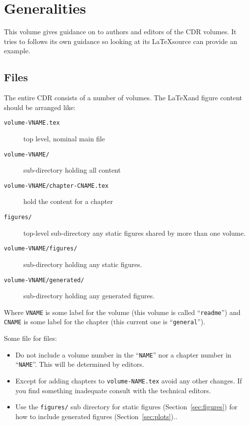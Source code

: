 \chapter{Generalities}

This volume gives guidance on to authors and editors of the CDR volumes.  It tries to follows its own guidance so looking at its \LaTeX source can provide an example.  

\section{Files}
\label{sec:files}

The entire CDR consists of a number of volumes.  The \LaTeX and figure content should be arranged like:

\begin{description}
\item[\texttt{volume-VNAME.tex}] top level, nominal main file
\item[\texttt{volume-VNAME/}] sub-directory holding all content
\item[\texttt{volume-VNAME/chapter-CNAME.tex}] hold the content for a chapter
\item[\texttt{figures/}] top-level sub-directory any static figures shared by more than one volume.
\item[\texttt{volume-VNAME/figures/}] sub-directory holding any static figures.
\item[\texttt{volume-VNAME/generated/}] sub-directory holding any generated figures.
\end{description}

Where \texttt{VNAME} is some label for the volume (this volume is called ``\texttt{readme}'') and \texttt{CNAME} is some label for the chapter (this current one is ``\texttt{general}'').

Some file for files:

\begin{itemize}
\item Do not include a volume number in the ``\texttt{NAME}'' nor a chapter number in ``\texttt{NAME}''.  This will be determined by editors. 
\item Except for adding chapters to \texttt{volume-NAME.tex} avoid any other changes.  If you find something inadequate consult with the technical editors.
\item Use the \texttt{figures/} sub directory for static figures (Section~\ref{sec:figures}) for how to include generated figures (Section~\ref{sec:plots})..

\end{itemize}


